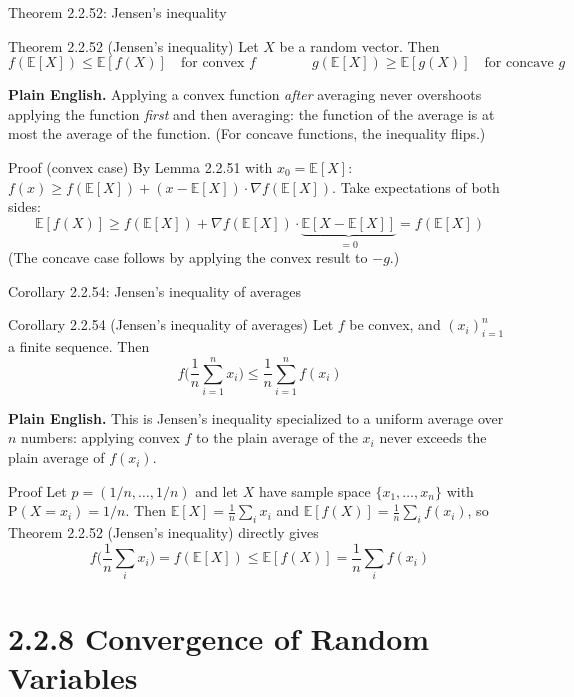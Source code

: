 \documentclass[aspectratio=169,10pt]{beamer}
\begin{document}
\begin{frame}{Theorem 2.2.52: Jensen's inequality}
\begin{block}{Theorem 2.2.52 (Jensen's inequality)}
Let $X$ be a random vector. Then
\[ f(\mathbb{E}[X]) \leq \mathbb{E}[f(X)] \quad\text{for convex } f
\qquad\qquad
g(\mathbb{E}[X]) \geq \mathbb{E}[g(X)] \quad\text{for concave } g \]
\end{block}
\textbf{Plain English.} Applying a convex function \emph{after} averaging
never overshoots applying the function \emph{first} and then averaging: the
function of the average is at most the average of the function. (For
concave functions, the inequality flips.)

\begin{block}{Proof (convex case)}
By Lemma 2.2.51 with $x_0=\mathbb{E}[X]$: $f(x)\geq f(\mathbb{E}[X])+(x-\mathbb{E}[X])\cdot\nabla f(\mathbb{E}[X])$.
Take expectations of both sides:
\[ \mathbb{E}[f(X)] \geq f(\mathbb{E}[X]) + \nabla f(\mathbb{E}[X])\cdot\underbrace{\mathbb{E}[X-\mathbb{E}[X]]}_{=0} = f(\mathbb{E}[X]) \]
(The concave case follows by applying the convex result to $-g$.)
\end{block}
\end{frame}

\begin{frame}{Corollary 2.2.54: Jensen's inequality of averages}
\begin{block}{Corollary 2.2.54 (Jensen's inequality of averages)}
Let $f$ be convex, and $(x_i)_{i=1}^n$ a finite sequence. Then
\[ f\Big(\frac1n\sum_{i=1}^n x_i\Big) \leq \frac1n\sum_{i=1}^n f(x_i) \]
\end{block}
\textbf{Plain English.} This is Jensen's inequality specialized to a uniform
average over $n$ numbers: applying convex $f$ to the plain average of the
$x_i$ never exceeds the plain average of $f(x_i)$.

\begin{block}{Proof}
Let $p=(1/n,\ldots,1/n)$ and let $X$ have sample space $\{x_1,\ldots,x_n\}$
with $\mathrm{P}(X=x_i)=1/n$. Then $\mathbb{E}[X]=\tfrac1n\sum_i x_i$ and
$\mathbb{E}[f(X)]=\tfrac1n\sum_i f(x_i)$, so Theorem 2.2.52 (Jensen's
inequality) directly gives
\[ f\Big(\frac1n\sum_i x_i\Big) = f(\mathbb{E}[X]) \leq \mathbb{E}[f(X)] = \frac1n\sum_i f(x_i) \]
\end{block}
\end{frame}

\section{2.2.8 Convergence of Random Variables}
\end{document}
